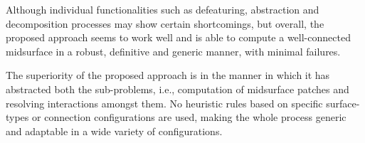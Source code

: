 % 
%
%


Although individual functionalities such as defeaturing, abstraction and decomposition processes may show certain shortcomings, but overall, the proposed approach seems to work well and is able to compute a well-connected midsurface in a robust, definitive and generic manner, with minimal failures.  

The superiority of the proposed approach is in the manner in which it has abstracted both the sub-problems, i.e., computation of midsurface patches and resolving interactions amongst them. No heuristic rules based on specific surface-types or connection configurations are used, making the whole process generic and adaptable in a wide variety of configurations.


